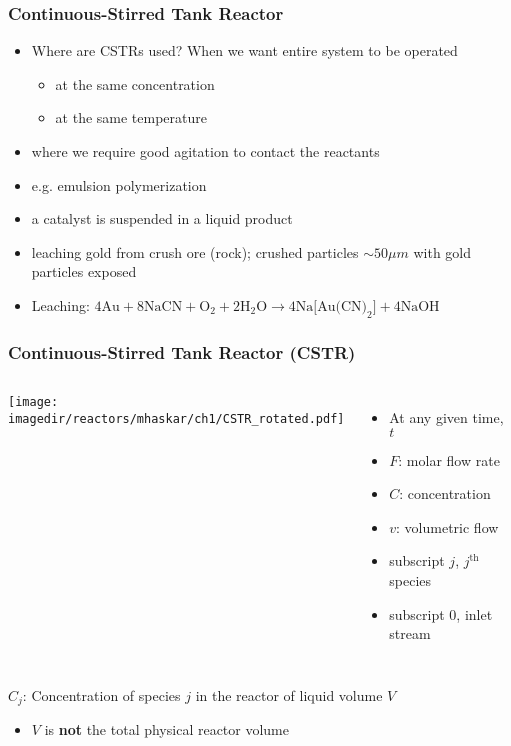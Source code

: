 \begin{frame}\frametitle{Continuous-Stirred Tank Reactor}
	\begin{itemize}
		
		\item	Where are CSTRs used? When we want entire system to be operated
		\begin{itemize}
			\item	at the same concentration
			\item	at the same temperature
		\end{itemize}
		\item	where we require good agitation to contact the reactants
		\item	e.g. emulsion polymerization
		\item	a catalyst is suspended in a liquid product
		\item	leaching gold from crush ore (rock); crushed particles $\sim 50 \mu m$ with gold particles exposed
		\item	Leaching: $4\text{Au} + 8\text{NaCN} + \text{O}_2 + 2 \text{H}_2\text{O} \longrightarrow  4 \text{Na[Au(CN)}_2\text{]} + 4 \text{NaOH}$
	\end{itemize}
\end{frame}

\begin{frame}\frametitle{Continuous-Stirred Tank Reactor (CSTR)}
	\begin{columns}[c]
			\texttt{[image: \\imagedir/reactors/mhaskar/ch1/CSTR\_rotated.pdf]}
			\begin{itemize}
				\vspace{-3mm}
				\item	At any given time, $t$
				\item	$F$: molar flow rate
				\item	$C$: concentration
				\item	$v$: volumetric flow
				\item	subscript $j$, $j^\text{th}$ species
				\item	subscript $0$, inlet stream
			\end{itemize}
	\end{columns}
	\vspace{24pt}
	$C_{j}$: Concentration of species $j$ in the reactor of liquid volume $V$
	\vspace{12pt}
	\begin{itemize}
		\item	$V$ is \textbf{not} the total physical reactor volume
	\end{itemize}
\end{frame}

